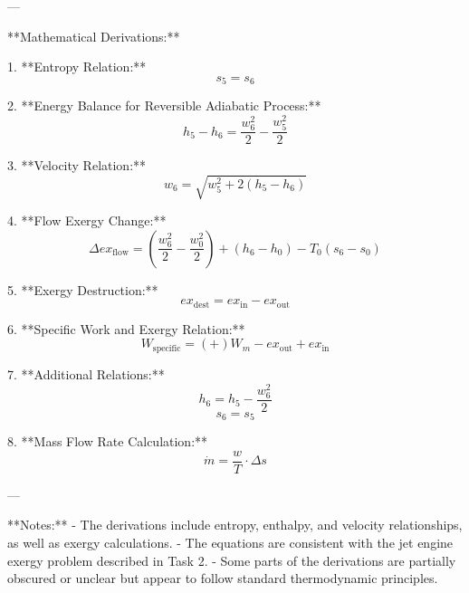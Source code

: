 ---

**Mathematical Derivations:**

1. **Entropy Relation:**
   \[
   s_5 = s_6
   \]

2. **Energy Balance for Reversible Adiabatic Process:**
   \[
   h_5 - h_6 = \frac{w_6^2}{2} - \frac{w_5^2}{2}
   \]

3. **Velocity Relation:**
   \[
   w_6 = \sqrt{w_5^2 + 2(h_5 - h_6)}
   \]

4. **Flow Exergy Change:**
   \[
   \Delta ex_{\text{flow}} = \left( \frac{w_6^2}{2} - \frac{w_0^2}{2} \right) + (h_6 - h_0) - T_0(s_6 - s_0)
   \]

5. **Exergy Destruction:**
   \[
   ex_{\text{dest}} = ex_{\text{in}} - ex_{\text{out}}
   \]

6. **Specific Work and Exergy Relation:**
   \[
   W_{\text{specific}} = (+) W_m - ex_{\text{out}} + ex_{\text{in}}
   \]

7. **Additional Relations:**
   \[
   h_6 = h_5 - \frac{w_6^2}{2}
   \]
   \[
   s_6 = s_5
   \]

8. **Mass Flow Rate Calculation:**
   \[
   \dot{m} = \frac{w}{T} \cdot \Delta s
   \]

---

**Notes:**
- The derivations include entropy, enthalpy, and velocity relationships, as well as exergy calculations.
- The equations are consistent with the jet engine exergy problem described in Task 2.
- Some parts of the derivations are partially obscured or unclear but appear to follow standard thermodynamic principles.